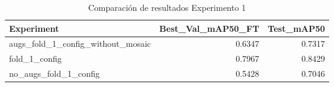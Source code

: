 \begin{table}
\caption{Comparación de resultados Experimento 1}
\label{tab:exp1}
\begin{tabular}{lrr}
\toprule
Experiment & Best_Val_mAP50_FT & Test_mAP50 \\
\midrule
augs_fold_1_config_without_mosaic & 0.6347 & 0.7317 \\
fold_1_config & 0.7967 & 0.8429 \\
no_augs_fold_1_config & 0.5428 & 0.7046 \\
\bottomrule
\end{tabular}
\end{table}
